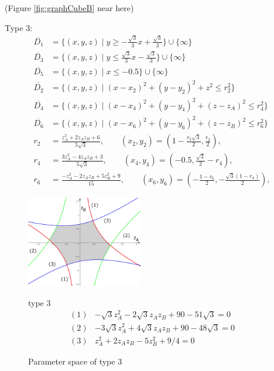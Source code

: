 \documentclass[suppldata, dvipdfmx]{interact}
\theoremstyle{plain}%
\theoremstyle{definition}
\theoremstyle{remark}
\theoremstyle{problemstyle}
\begin{document}
\noindent(Figure \ref{fig:graphCubeB} near here)

\bigskip\par
Type 3:
\begin{align*}
\overline{D_1}&=\{(x,y,z) \mid y \ge -\frac{\sqrt{3}}{3}x + \frac{\sqrt{3}}{3}\} \cup \{ \infty \}\\
\overline{D_3}&=\{(x,y,z) \mid y \le \frac{\sqrt{3}}{3}x - \frac{\sqrt{3}}{3} \} \cup\{\infty\}\\
\overline{D_5}&=\{(x,y,z) \mid x \le -0.5 \} \cup\{\infty\}\\
\overline{D_2}&=\{(x,y,z) \mid (x-x_2)^2+(y-y_2)^2+z^2 \le r_2^2 \} \\
\overline{D_4}&=\{(x,y,z) \mid (x-x_4)^2+(y-y_4)^2+(z-z_A)^2 \le r_4^2 \} \\
\overline{D_6}&=\{(x,y,z) \mid (x-x_6)^2+(y-y_6)^2+(z-z_B)^2 \le r_6^2 \} \\
 r_2 &= \frac{z_A^2 + 2z_Az_B + 6}{5\sqrt{3}}, \qquad
(x_2, y_2) = \left(1-\frac{r_2\sqrt{3}}{2}, \frac{r_2}{2}\right),\\
 r_4 &= \frac{3z_A^2 - 4z_Az_B + 3}{5\sqrt{3}}, \qquad
(x_4, y_4) = \left(-0.5, \frac{\sqrt{3}}{2} - r_4\right),\\
 r_6 &= \frac{-z_A^2 - 2z_Az_B + 5z_B^2+ 9}{15}, \qquad
(x_6, y_6) = \left(-\frac{1 - r_6}{2}, - \frac{\sqrt{3}(1 - r_4)}{2}\right),
\end{align*} 
\begin{figure}[h]
 \begin{minipage}[]{0.5\textwidth}
 \centering
 \includegraphics[width=2in,
 keepaspectratio]{./img/graph/cubeC.jpg}
 \caption{Parameter space of type 3}
 \label{fig:graphCubeC}
 \end{minipage}
 \hspace*{\fill}
 \begin{minipage}[]{0.5\textwidth}
  \centering
  type 3
  \begin{align*}
   (1)& -\sqrt{3}z_A^2 - 2\sqrt{3}z_Az_B + 90 - 51\sqrt{3} = 0\\
   (2)& -3\sqrt{3}z_A^2 + 4\sqrt{3}z_A z_B + 90 - 48\sqrt{3} = 0\\
   (3)& z_A^2 + 2 z_A z_B - 5z_B^2 + 9/4 = 0
  \end{align*}
 \end{minipage}
 \hspace*{\fill}
\end{figure}
\end{document}
